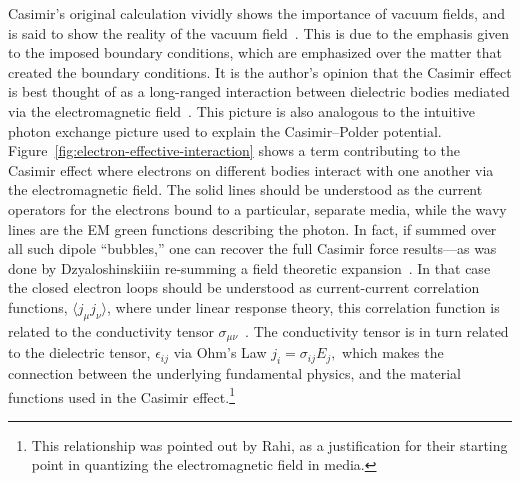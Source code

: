 Casimir's original calculation vividly shows the importance of vacuum fields, and is said to show the reality 
of the vacuum field~\cite{Jaffe2005}.  This is due to the emphasis given to the imposed boundary conditions,
which are emphasized over the matter that created the boundary conditions.  
It is the author's opinion that the Casimir effect is best thought of as a long-ranged interaction between dielectric bodies 
mediated via the electromagnetic field~\cite{Jaffe2005, Rahi2009}.  This picture is also
analogous to the intuitive photon exchange picture used to explain the Casimir--Polder potential.
  Figure~\ref{fig:electron-effective-interaction} shows a term contributing to the Casimir effect where 
electrons on different bodies interact with one another via the electromagnetic field.
  The solid lines should
be understood as the current operators for the electrons bound to a particular, separate media, while the 
wavy lines are the EM green functions describing the photon.  In fact, if summed over all such dipole ``bubbles,''
one can recover the full Casimir force results---as was done by Dzyaloshinskii\etal in re-summing a field 
theoretic expansion~\cite{Dzyaloshinskii1961}.  
In that case the closed electron loops should be understood as current-current correlation functions,
$\langle j_\mu j_\nu\rangle$, where under linear response theory, this correlation function is related to the conductivity
tensor $\sigma_{\mu\nu}$~\cite{Kubo1957,Altland2011}.  The conductivity tensor is in turn related to the dielectric tensor, $\epsilon_{ij}$
via Ohm's Law $j_i=\sigma_{ij}E_j,$ which makes the connection between the underlying fundamental physics,
and the material functions used in the Casimir effect.\footnote{
  This relationship was pointed out by Rahi\etal\cite{Rahi2009}, as a justification for their starting point
  in quantizing the electromagnetic field in media.}


